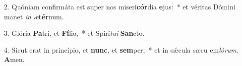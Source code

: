 \item 2. Quóniam confirmáta est super nos miseri\textbf{cór}dia \textbf{e}jus:~* et véritas Dómini manet \textit{in} \textit{æ}\textbf{tér}num.
\item 3. Glória \textbf{Pa}tri, et \textbf{Fí}lio,~* et Spirí\textit{tui} \textbf{San}cto.
\item 4. Sicut erat in princípio, et \textbf{nunc}, et \textbf{sem}per,~* et in sǽcula sæcu em\textit{lórum}. \textbf{A}men.
